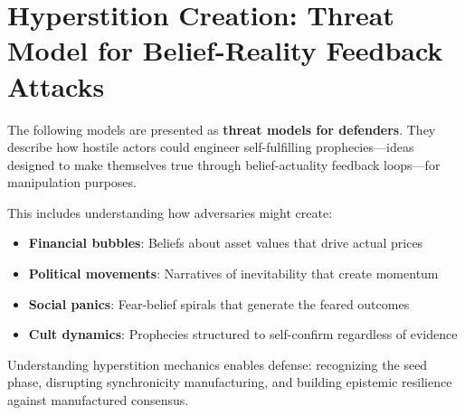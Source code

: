 
\chapter{Hyperstition Creation: Threat Model for Belief-Reality Feedback Attacks}
\label{ch:hyperstition-creation}

\begin{tcolorbox}[colback=red!5!white,colframe=red!75!black,title=\textbf{THREAT MODEL NOTICE},breakable]
The following models are presented as \textbf{threat models for defenders}. They describe how hostile actors could engineer self-fulfilling prophecies---ideas designed to make themselves true through belief-actuality feedback loops---for manipulation purposes.

This includes understanding how adversaries might create:
\begin{itemize}
    \item \textbf{Financial bubbles}: Beliefs about asset values that drive actual prices
    \item \textbf{Political movements}: Narratives of inevitability that create momentum
    \item \textbf{Social panics}: Fear-belief spirals that generate the feared outcomes
    \item \textbf{Cult dynamics}: Prophecies structured to self-confirm regardless of evidence
\end{itemize}
Understanding hyperstition mechanics enables defense: recognizing the seed phase, disrupting synchronicity manufacturing, and building epistemic resilience against manufactured consensus.
\end{tcolorbox}

